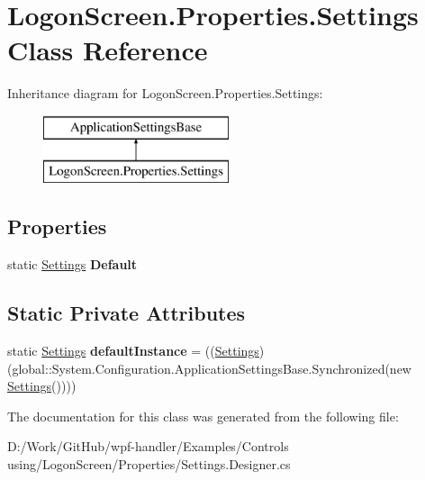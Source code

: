 \hypertarget{class_logon_screen_1_1_properties_1_1_settings}{}\section{Logon\+Screen.\+Properties.\+Settings Class Reference}
\label{class_logon_screen_1_1_properties_1_1_settings}
Inheritance diagram for Logon\+Screen.\+Properties.\+Settings\+:\begin{figure}[H]
\begin{center}
\leavevmode
\includegraphics[height=2.000000cm]{d9/df9/class_logon_screen_1_1_properties_1_1_settings}
\end{center}
\end{figure}
\subsection*{Properties}
\begin{DoxyCompactItemize}
\item 
\mbox{\label{class_logon_screen_1_1_properties_1_1_settings_a8357dca092bd3eb8939a7de143f4d604}} 
static \mbox{\hyperlink{class_logon_screen_1_1_properties_1_1_settings}{Settings}} {\bfseries Default}
\end{DoxyCompactItemize}
\subsection*{Static Private Attributes}
\begin{DoxyCompactItemize}
\item 
\mbox{\label{class_logon_screen_1_1_properties_1_1_settings_af9eb9c02b44e6f28e213fe5b7b8e35db}} 
static \mbox{\hyperlink{class_logon_screen_1_1_properties_1_1_settings}{Settings}} {\bfseries default\+Instance} = ((\mbox{\hyperlink{class_logon_screen_1_1_properties_1_1_settings}{Settings}})(global\+::\+System.\+Configuration.\+Application\+Settings\+Base.\+Synchronized(new \mbox{\hyperlink{class_logon_screen_1_1_properties_1_1_settings}{Settings}}())))
\end{DoxyCompactItemize}


The documentation for this class was generated from the following file\+:\begin{DoxyCompactItemize}
\item 
D\+:/\+Work/\+Git\+Hub/wpf-\/handler/\+Examples/\+Controls using/\+Logon\+Screen/\+Properties/Settings.\+Designer.\+cs\end{DoxyCompactItemize}
